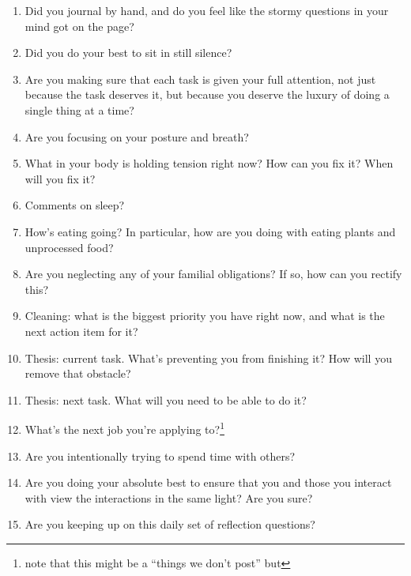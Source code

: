 \documentclass[12pt]{article}
\newcommand{\say}[1]{``#1''}
\renewcommand{\,}{\textsuperscript{,}}
\begin{document}
\begin{enumerate}

\item Did you journal by hand, and do you feel like the stormy questions in your mind got on the page?

\item Did you do your best to sit in still silence?

\item Are you making sure that each task is given your full attention, not just because the task deserves it, but because you deserve the luxury of doing a single thing at a time?

\item Are you focusing on your posture and breath?

\item What in your body is holding tension right now? How can you fix it? When will you fix it?

\item Comments on sleep?

\item How's eating going? In particular, how are you doing with eating plants and unprocessed food?

\item Are you neglecting any of your familial obligations? If so, how can you rectify this?

\item Cleaning: what is the biggest priority you have right now, and what is the next action item for it?

\item Thesis: current task. What's preventing you from finishing it? How will you remove that obstacle?

\item Thesis: next task. What will you need to be able to do it?

\item What's the next job you're applying to?\footnote{note that this might be a \say{things we don't post} but}

\item Are you intentionally trying to spend time with others?

\item Are you doing your absolute best to ensure that you and those you interact with view the interactions in the same light? Are you sure?

\item Are you keeping up on this daily set of reflection questions?


\end{enumerate}
\end{document}
